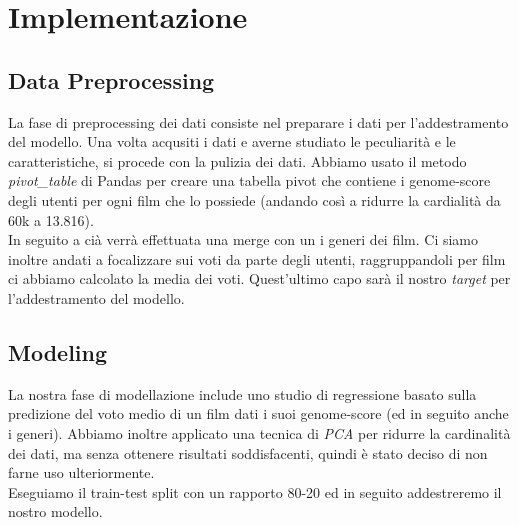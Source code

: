 \documentclass[../../Report.tex]{subfiles}
\begin{document}
\chapter{Implementazione}
\section{Data Preprocessing}
La fase di preprocessing dei dati consiste nel preparare i dati per l'addestramento del modello.
Una volta acqusiti i dati e averne studiato le peculiarità e le caratteristiche, si procede con la pulizia dei dati.
Abbiamo usato il metodo \textit{pivot\_table} di Pandas per creare una tabella pivot che contiene i genome-score degli utenti per ogni film che lo possiede (andando così a ridurre la cardialità da 60k a 13.816).\\
In seguito a cià verrà effettuata una merge con un i generi dei film.
Ci siamo inoltre andati a focalizzare sui voti da parte degli utenti, raggruppandoli per film ci abbiamo calcolato la media dei voti.
Quest'ultimo capo sarà il nostro \textit{target} per l'addestramento del modello.\\

\section{Modeling}
La nostra fase di modellazione include uno studio di regressione basato sulla predizione del voto medio di un film dati i suoi genome-score (ed in seguito anche i generi).
Abbiamo inoltre applicato una tecnica di \textit{PCA} per ridurre la cardinalità dei dati, ma senza ottenere risultati soddisfacenti, quindi è stato deciso di non farne uso ulteriormente.\\

Eseguiamo il train-test split con un rapporto 80-20 ed in seguito addestreremo il nostro modello.
\end{document}
